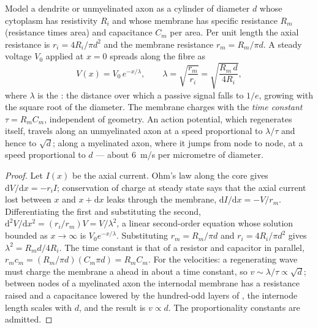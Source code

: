 \begin{theorem}\label{thm:b3:nervous-systems:cable}
Model a dendrite or unmyelinated axon as a cylinder of diameter $d$
whose cytoplasm has resistivity $R_{i}$ and whose membrane has specific
resistance $R_{m}$ (resistance times area) and capacitance $C_{m}$ per
area. Per unit length the axial resistance is $r_{i} = 4R_{i}/\pi d^{2}$
and the membrane resistance $r_{m} = R_{m}/\pi d$. A steady voltage
$V_{0}$ applied at $x = 0$ spreads along the fibre as
\[
V(x) = V_{0}\,e^{-x/\lambda}, \qquad
\lambda = \sqrt{\frac{r_{m}}{r_{i}}} = \sqrt{\frac{R_{m}\,d}{4R_{i}}},
\]
where $\lambda$ is the \emph{}: the distance over which
a passive signal falls to $1/e$, growing with the square root of the
diameter. The membrane charges with the \emph{time constant} $\tau =
R_{m}C_{m}$, independent of geometry. An action potential, which
regenerates itself, travels along an unmyelinated axon at a speed
proportional to $\lambda/\tau$ and hence to $\sqrt{d}$; along a
myelinated axon, where it jumps from node to node, at a speed
proportional to $d$ --- about \qty{6}{m/s} per micrometre of diameter.
\end{theorem}
\begin{proof}
Let $I(x)$ be the axial current. Ohm's law along the core gives
$\mathrm{d}V/\mathrm{d}x = -r_{i}I$; conservation of charge at steady
state says that the axial current lost between $x$ and $x + \mathrm{d}x$
leaks through the membrane, $\mathrm{d}I/\mathrm{d}x = -V/r_{m}$.
Differentiating the first and substituting the second,
$\mathrm{d}^{2}V/\mathrm{d}x^{2} = (r_{i}/r_{m})V = V/\lambda^{2}$, a
linear second-order equation whose solution bounded as $x \to \infty$ is
$V_{0}e^{-x/\lambda}$. Substituting $r_{m} = R_{m}/\pi d$ and $r_{i} =
4R_{i}/\pi d^{2}$ gives $\lambda^{2} = R_{m}d/4R_{i}$. The time constant
is that of a resistor and capacitor in parallel, $r_{m}c_{m} =
(R_{m}/\pi d)(C_{m}\pi d) = R_{m}C_{m}$. For the velocities: a
regenerating wave must charge the membrane a  ahead in
about a time constant, so $v \sim \lambda/\tau \propto \sqrt{d}$;
between nodes of a myelinated axon the internodal membrane has a
resistance raised and a capacitance lowered by the hundred-odd layers of
, the internode length scales with $d$, and the result is
$v \propto d$. The proportionality constants are admitted.
\end{proof}

